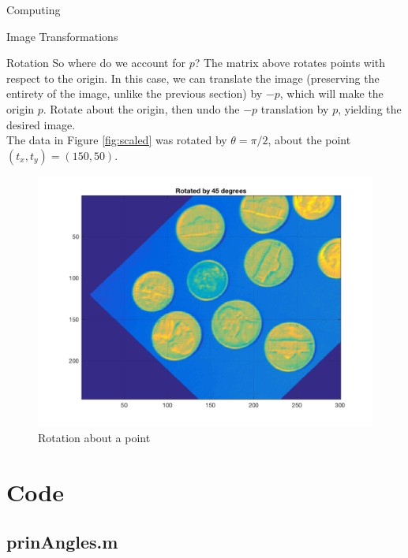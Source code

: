 \begin{section}{Computing}
\begin{homeworkSection}{Image Transformations}
\begin{subsubsection}{Rotation}
So where do we account for $p$? The matrix above rotates points with respect to the origin. In this case, we can translate the image (preserving the entirety of the image, unlike the previous section) by $-p$, which will make the origin $p$. Rotate about the origin, then undo the $-p$ translation by $p$, yielding the desired image.
\\

The data in Figure \ref{fig:scaled} was rotated by $\theta = \pi/2$, about the point $(t_x, t_y) = (150, 50)$. 

\begin{figure}[!h]
\centering
\includegraphics[width=0.75\columnwidth]{../data/rotated} %
\caption{Rotation about a point}
\label{fig:rotated}
\end{figure}
\end{subsubsection}

\end{homeworkSection}



\end{section}



\newpage

\appendix

\section{Code}

\subsection{prinAngles.m}




